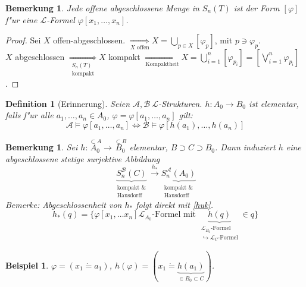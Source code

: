 \documentclass[a4paper,12pt,numbers=noenddot,parskip=full]{scrartcl}
\newcommand{\scrL}{\mathcal{L}}
\newcommand{\scrA}{\mathcal{A}}
\newcommand{\scrB}{\mathcal{B}}
\theoremstyle{dotless}
\newtheorem{definition}[theorem]{Definition}
\newtheorem{example}[theorem]{Beispiel}
\newtheorem{remark}[theorem]{Bemerkung}
\begin{document}
\begin{remark}
	Jede offene abgeschlossene Menge in $S_n(T)$ ist der Form $[\varphi]$ f"ur eine $\scrL$-Formel $\varphi[x_1, \dots, x_n]$.
\end{remark}
\begin{proof}
	Sei $X$ offen-abgeschlossen. $\underset{X \text{ offen}}{\Longrightarrow} X = \bigcup\limits_{p \in X} [\varphi_p]$, mit $p \ni \varphi_p$.\\
	$X$ abgeschlossen $\underset{\substack{S_n(T)\\\text{kompakt}}}{\Longrightarrow} X$ kompakt $\underset{\text{Kompaktheit}}{\Longrightarrow} X = \bigcup\limits_{i=1}^n [\varphi_{p_i}] = [\bigvee\limits_{i=1}^n \varphi_{p_i}]$.
\end{proof}
\begin{definition}[Erinnerung]
	Seien $\scrA, \scrB ~\scrL$-Strukturen. $h: A_0 \longrightarrow B_0$ ist elementar, falls f"ur alle $a_1, \dots, a_n \in A_0$, $\varphi=\varphi[a_1, \dots, a_n]$ gilt:
	\begin{equation*}
		\scrA \models \varphi[a_1, \dots, a_n] \Longleftrightarrow \scrB \models \varphi[h(a_1), \dots, h(a_n)]
	\end{equation*}
\end{definition}
\begin{remark}\label{hstern}
	Sei $h: \overset{\subset A}{A_0} \longrightarrow \overset{\subset B}{B_0}$ elementar, $B \supset C \supset B_0$. Dann induziert $h$ eine abgeschlossene stetige surjektive Abbildung
	\begin{equation*}
		\underbrace{S_n^\scrB(C)}_{\substack{\text{kompakt \&}\\\text{Hausdorff}}} \overset{h_*}{\longrightarrow} \underbrace{S_n^\scrA(A_0)}_{\substack{\text{kompakt \&}\\\text{Hausdorff}}}
	\end{equation*}
	\emph{Bemerke:} Abgeschlossenheit von $h_*$ folgt direkt mit \ref{huk}.
	\begin{equation*}
		h_*(q) = \{\varphi[x_1, \dots x_n] \scrL_{A_0} \text{-Formel mit } \underbrace{h(q)}_{\substack{\scrL_{B_0} \text{-Formel}\\\hookrightarrow \scrL_C \text{-Formel}}} \in q \}
	\end{equation*}
\end{remark}
\begin{example}
	$\varphi = (x_1 \dot= a_1)$, $h(\varphi) = (x_1 \dot= \underbrace{h(a_1)}_{\in B_0 \subset C})$.
\end{example}
\end{document}

